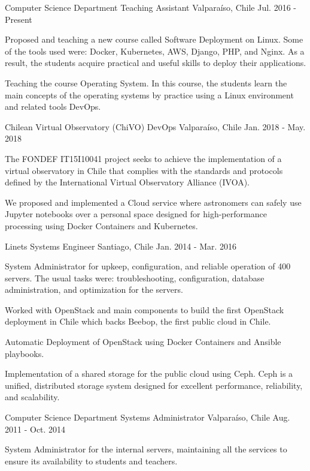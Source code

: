 \begin{cventries}
  \cventry
    {Computer Science Department}
    {Teaching Assistant}
    {Valparaíso, Chile}
    {Jul. 2016 - Present}
    {
      \begin{cvitems}
        \item {Proposed and teaching a new course called Software Deployment on Linux. Some of the tools used were: Docker, Kubernetes, AWS, Django, PHP, and Nginx. As a result, the students acquire practical and useful skills to deploy their applications.}
        \item {Teaching the course Operating System. In this course, the students learn the main concepts of the operating systems by practice using a Linux environment and related tools DevOps.}
      \end{cvitems}
    }
    
    
  \cventry
    {Chilean Virtual Observatory (ChiVO)}
    {DevOps}
    {Valparaíso, Chile}
    {Jan. 2018 - May. 2018}
    {
      \begin{cvitems}
        \item {The FONDEF IT15I10041 project seeks to achieve the implementation of a virtual observatory in Chile that complies with the standards and protocols defined by the International Virtual Observatory Alliance (IVOA).}
        \item {We proposed and implemented a Cloud service where astronomers can safely use Jupyter notebooks over a personal space designed for high-performance processing using Docker Containers and Kubernetes.}
      \end{cvitems}
    }
    

  \cventry
    {Linets}
    {Systems Engineer}    
    {Santiago, Chile}
    {Jan. 2014 - Mar. 2016}
    {
      \begin{cvitems}
        \item {System Administrator for upkeep, configuration, and reliable operation of 400 servers. The usual tasks were: troubleshooting, configuration, database administration, and optimization for the servers.}
        \item {Worked with OpenStack and main components to build the first OpenStack deployment in Chile which backs Beebop, the first public cloud in Chile.}
        \item {Automatic Deployment of OpenStack using Docker Containers and Ansible playbooks.}
        \item {Implementation of a shared storage for the public cloud using Ceph. Ceph is a unified, distributed storage system designed for excellent performance, reliability, and scalability.}
      \end{cvitems}
    }
    
  \cventry
    {Computer Science Department}
    {Systems Administrator}    
    {Valparaíso, Chile}
    {Aug. 2011 - Oct. 2014}
    {
      \begin{cvitems}
		\item{System Administrator for the internal servers, maintaining all the services to ensure its availability to students and teachers.}
      \end{cvitems}
    }    
\end{cventries}

